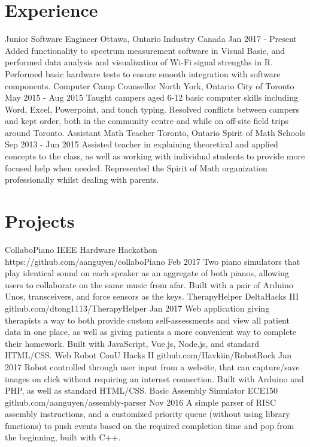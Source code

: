 \documentclass[]{aanguyen_cv}
\begin{document}
	\begin{main}%
		\vspace{35pt}%
		\section{Experience}
			\mainentry%
				{Junior Software Engineer}%
				{Ottawa, Ontario}%
				{Industry Canada}%
				{Jan 2017 - Present}%
				{Added functionality to spectrum measurement software in Visual Basic, and performed data analysis and visualization of Wi-Fi signal strengths in R. Performed basic hardware tests to ensure smooth integration with software components.}
			\mainentry%
				{Computer Camp Counsellor}%
				{North York, Ontario}%
				{City of Toronto}%
				{May 2015 - Aug 2015}%
				{Taught campers aged 6-12 basic computer skills including Word, Excel, Powerpoint, and touch typing. Resolved conflicts between campers and kept order, both in the community centre and while on off-site field trips around Toronto.}
			\mainentry%
				{Assistant Math Teacher}%
				{Toronto, Ontario}%
				{Spirit of Math Schools}%
				{Sep 2013 - Jun 2015}%
				{Assisted teacher in explaining theoretical and applied concepts to the class, as well as working with individual students to provide more focused help when needed. Represented the Spirit of Math organization professionally whilst dealing with parents.}
			\vspace{0.65cm}%
		\section{Projects}
			\mainentry%
				{CollaboPiano}%
				{IEEE Hardware Hackathon}%
				{https://github.com/aanguyen/collaboPiano}%
				{Feb 2017}%
				{Two piano simulators that play identical sound on each speaker as an aggregate of both pianos, allowing users to collaborate on the same music from afar. Built with a pair of Arduino Unos, transceivers, and force sensors as the keys.}
			\mainentry%
				{TherapyHelper {\faGithub}}%
				{DeltaHacks III}%
				{github.com/dtong1113/TherapyHelper}%
				{Jan 2017}%
				{Web application giving therapists a way to both provide custom self-assessments and view all patient data in one place, as well as giving patients a more convenient way to complete their homework. Built with JavaScript, Vue.js, Node.js, and standard HTML/CSS.}
			\mainentry%
				{Web Robot {\faGithub}}%
				{ConU Hacks II}%
				{github.com/Havkiin/RobotRock}%
				{Jan 2017}%
				{Robot controlled through user input from a website, that can capture/save images on click without requiring an internet connection. Built with Arduino and PHP, as well as standard HTML/CSS.}
			\mainentry%
				{Basic Assembly Simulator {\faGithub}}%
				{ECE150}%
				{github.com/aanguyen/assembly-parser}%
				{Nov 2016}%
				{A simple parser of RISC assembly instructions, and a customized priority queue (without using library functions) to push events based on the required completion time and pop from the beginning, built with C++.}
			\vspace{0.65cm}%
	\end{main}%
\end{document}
